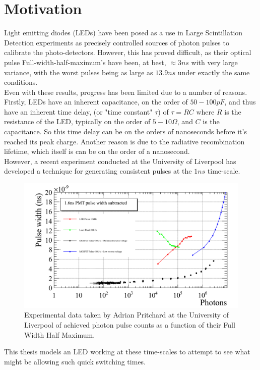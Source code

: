 \documentclass[titlepage]{article}
\begin{document}
\section{Motivation}
Light emitting diodes (LEDs) have been posed as a use in Large Scintillation Detection experiments as precisely controlled sources of photon pulses to calibrate the photo-detectors. However, this has proved difficult, as their optical pulse Full-width-half-maximum's have been, at best, $\approx 3ns$ with very large variance, with the worst pulses being as large as $13.9ns$ under exactly the same conditions.\cite{Veledar_Paper}\\ 
Even with these results, progress has been limited due to a number of reasons. Firstly, LEDs have an inherent capacitance, on the order of $50-100pF$\cite{Veledar_Paper}, and thus have an inherent time delay, (or "time constant" $\tau$) of $\tau = RC$ where $R$ is the resistance of the LED, typically on the order of $5-10\Omega$, and $C$ is the capacitance. So this time delay can be on the orders of nanoseconds before it's reached its peak charge. Another reason is due to the radiative recombination lifetime, which itself is can be on the order of a nanosecond. \\
However, a recent experiment conducted at the University of Liverpool has developed a technique for generating consistent pulses at the $1ns$ time-scale.\cite{Data}
\begin{figure}[H]
	\centering
	\includegraphics[scale=0.25]{Figures/ExperimentalData}
	\caption{Experimental data taken by Adrian Pritchard at the University of Liverpool of achieved photon pulse counts as a function of their Full Width Half Maximum. \cite{Data}}
\end{figure}
This thesis models an LED working at these time-scales to attempt to see what might be allowing such quick switching times.
\end{document}
